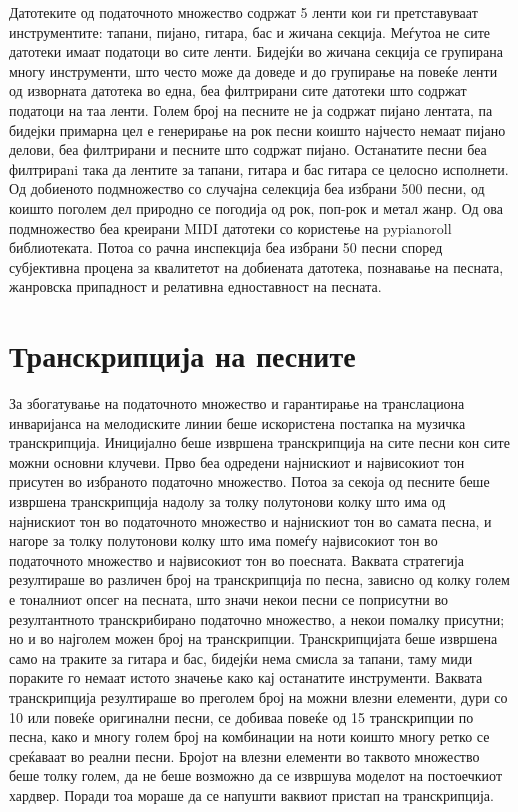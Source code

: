 Датотеките од податочното множество содржат 5 ленти кои ги претставуваат инструментите: тапани, пијано, гитара, бас и жичана секција. Меѓутоа не сите датотеки имаат податоци во сите ленти. Бидејќи во жичана секција се групирана многу инструменти, што често може да доведе и до групирање на повеќе ленти од изворната датотека во една, беа филтрирани сите датотеки што содржат податоци на таа ленти. Голем број на песните не ја содржат пијано лентата, па бидејки примарна цел е генерирање на рок песни коишто најчесто немаат пијано делови, беа филтрирани и песните што содржат пијано. Останатите песни беа филтрираni така да лентите за тапани, гитара и бас гитара се целосно исполнети. Од добиеното подмножество со случајна селекција беа избрани 500 песни, од коишто поголем дел природно се погодија од рок, поп-рок и метал жанр. Од ова подмножество беа креирани MIDI датотеки со користење на pypianoroll библиотеката. Потоа со рачна инспекција беа избрани 50 песни според субјективна процена за квалитетот на добиената датотека, познавање на песната, жанровска припадност и релативна едноставност на песната.

\section{Транскрипција на песните}

За збогатување на податочното множество и гарантирање на транслациона инваријанса на мелодиските линии беше искористена постапка на музичка транскрипција. Иницијално беше извршена транскрипција на сите песни кон сите можни основни клучеви. Прво беа одредени најнискиот и највисокиот тон присутен во избраното податочно множество. Потоа за секоја од песните беше извршена транскрипција надолу за толку полутонови колку што има од најнискиот тон во податочното множество и најнискиот тон во самата песна, и нагоре за толку полутонови колку што има помеѓу највисокиот тон во податочното множество и највисокиот тон во поесната. Ваквата стратегија резултираше во различен број на транскрипција по песна, зависно од колку голем е тоналниот опсег на песната, што значи некои песни се поприсутни во резултантното транскрибирано податочно множество, а некои помалку присутни; но и во најголем можен број на транскрипции. Транскрипцијата беше извршена само на траките за гитара и бас, бидејќи нема смисла за тапани, таму миди пораките го немаат истото значење како кај останатите инструменти. Ваквата транскрипција резултираше во преголем број на можни влезни елементи, дури со 10 или повеќе оригинални песни, се добиваа повеќе од 15 транскрипции по песна, како и многу голем број на комбинации на ноти коишто многу ретко се среќаваат во реални песни. Бројот на влезни елементи во таквото множество беше толку голем, да не беше возможно да се извршува моделот на постоечкиот хардвер. Поради тоа мораше да се напушти ваквиот пристап на транскрипција. 

